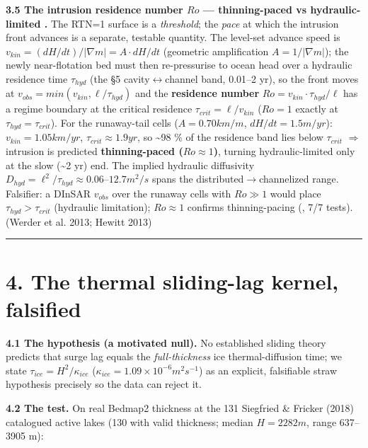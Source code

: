 \documentclass[11pt]{article}
\begin{document}
\textbf{3.5 The intrusion residence number $Ro$ — thinning-paced vs hydraulic-limited .} The RTN=1 surface is a \emph{threshold}; the \emph{pace} at which the intrusion front advances is a separate, testable quantity. The level-set advance speed is $v_{kin}=(dH/dt)/|\nabla m|=A\cdot dH/dt$ (geometric amplification $A=1/|\nabla m|$); the newly near-flotation bed must then re-pressurise to ocean head over a hydraulic residence time $\tau _{hyd}$ (the §5 cavity\ensuremath{\leftrightarrow}channel band, 0.01–2 yr), so the front moves at $v_{obs}=min(v_{kin}, \ell /\tau _{hyd})$ and the \textbf{residence number} $Ro=v_{kin}\cdot \tau _{hyd}/\ell $ has a regime boundary at the critical residence $\tau _{crit}=\ell /v_{kin}$ ($Ro=1$ exactly at $\tau _{hyd}=\tau _{crit}$). For the runaway-tail cells ($A=0.70 km/m$, $dH/dt=1.5 m/yr$): $v_{kin}=1.05 km/yr$, $\tau _{crit}\approx 1.9 yr$, so \textasciitilde{}98 \% of the residence band lies below $\tau _{crit}$ \ensuremath{\Rightarrow} intrusion is predicted \textbf{thinning-paced ($Ro\approx 1$)}, turning hydraulic-limited only at the slow (\textasciitilde{}2 yr) end. The implied hydraulic diffusivity $D_{hyd}=\ell ^{2}/\tau _{hyd}\approx 0.06–12.7 m^{2}/s$ spans the distributed\ensuremath{\to}channelized range. Falsifier: a DInSAR $v_{obs}$ over the runaway cells with $Ro\gg 1$ would place $\tau _{hyd}>\tau _{crit}$ (hydraulic limitation); $Ro\approx 1$ confirms thinning-pacing (, 7/7 tests). (Werder et al. 2013; Hewitt 2013)


\medskip\hrule\medskip


\section*{4. The thermal sliding-lag kernel, falsified}


\textbf{4.1 The hypothesis (a motivated null).} No established sliding theory predicts that surge lag equals the \emph{full-thickness} ice thermal-diffusion time; we state $\tau _{ice} = H^{2}/\kappa _{ice}$ ($\kappa _{ice}=1.09\times 10^{-6} m^{2} s^{-1}$) as an explicit, falsifiable straw hypothesis precisely so the data can reject it.


\textbf{4.2 The test.} On real Bedmap2 thickness at the 131 Siegfried \& Fricker (2018) catalogued active lakes (130 with valid thickness; median $H=2282 m$, range 637–3905 m):
\end{document}
